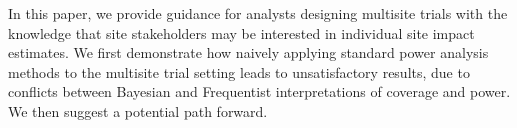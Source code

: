 \documentclass[]{article}
\begin{document}
In this paper, we provide guidance for analysts designing multisite trials with the knowledge that site stakeholders may be interested in individual site impact estimates.
We first demonstrate how naively applying standard power analysis methods to the multisite trial setting leads to unsatisfactory results, due to conflicts between Bayesian and Frequentist interpretations of coverage and power.
We then suggest a potential path forward.









\end{document}
